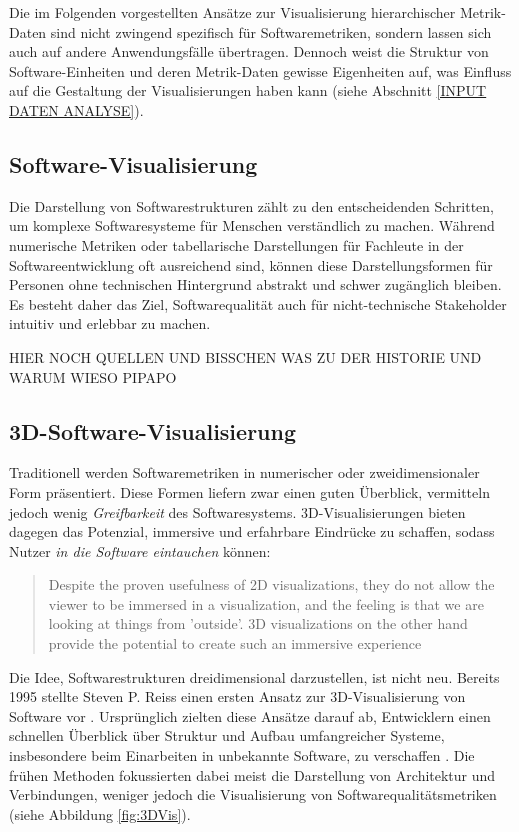 Die im Folgenden vorgestellten Ansätze zur Visualisierung hierarchischer Metrik-Daten sind nicht zwingend spezifisch für Softwaremetriken, sondern lassen sich auch auf andere Anwendungsfälle übertragen. Dennoch weist die Struktur von Software-Einheiten und deren Metrik-Daten gewisse Eigenheiten auf, was Einfluss auf die Gestaltung der Visualisierungen haben kann (siehe Abschnitt \ref{INPUT DATEN ANALYSE}).

\subsection{Software-Visualisierung} 
\label{sec:SoftwareVisualisierung} 

Die Darstellung von Softwarestrukturen zählt zu den entscheidenden Schritten, um komplexe Softwaresysteme für Menschen verständlich zu machen. Während numerische Metriken oder tabellarische Darstellungen für Fachleute in der Softwareentwicklung oft ausreichend sind, können diese Darstellungsformen für Personen ohne technischen Hintergrund abstrakt und schwer zugänglich bleiben. Es besteht daher das Ziel, Softwarequalität auch für nicht-technische Stakeholder intuitiv und erlebbar zu machen.

HIER NOCH QUELLEN UND BISSCHEN WAS ZU DER HISTORIE UND WARUM WIESO PIPAPO

\subsection{3D-Software-Visualisierung} \label{sec:3DSoftwareVisualisierung}

Traditionell werden Softwaremetriken in numerischer oder zweidimensionaler Form präsentiert. Diese Formen liefern zwar einen guten Überblick, vermitteln jedoch wenig \textit{Greifbarkeit} des Softwaresystems. 3D-Visualisierungen bieten dagegen das Potenzial, immersive und erfahrbare Eindrücke zu schaffen, sodass Nutzer \textit{in die Software eintauchen} können:
\begin{quote}
Despite the proven usefulness of 2D visualizations, they do not allow the viewer to be immersed in a visualization, and the feeling is that we are looking at things from 'outside'. 3D visualizations on the other hand provide the potential to create such an immersive experience \cite[1]{codeCity1}
\end{quote}

Die Idee, Softwarestrukturen dreidimensional darzustellen, ist nicht neu. Bereits 1995 stellte Steven P. Reiss einen ersten Ansatz zur 3D-Visualisierung von Software vor \cite{first_3D_vis}. Ursprünglich zielten diese Ansätze darauf ab, Entwicklern einen schnellen Überblick über Struktur und Aufbau umfangreicher Systeme, insbesondere beim Einarbeiten in unbekannte Software, zu verschaffen \cite{visSoftwareVR}. Die frühen Methoden fokussierten dabei meist die Darstellung von Architektur und Verbindungen, weniger jedoch die Visualisierung von Softwarequalitätsmetriken (siehe Abbildung \ref{fig:3DVis}).

